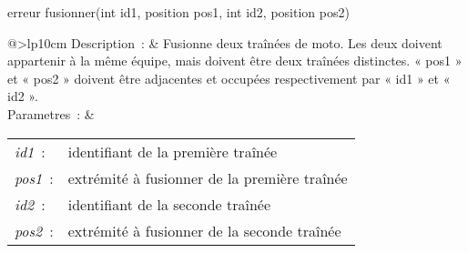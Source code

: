 \begin{minipage}{\linewidth}

\begin{lst-c++}
erreur fusionner(int id1, position pos1, int id2, position pos2)
\end{lst-c++}

\noindent
\begin{tabular}[t]{@{\extracolsep{0pt}}>{\bfseries}lp{10cm}}
Description~: & Fusionne deux traînées de moto. Les deux doivent appartenir à la même équipe, mais doivent être deux traînées distinctes. « pos1 » et « pos2 » doivent être adjacentes et occupées respectivement par « id1 » et « id2 ». \\


Parametres~: &
\begin{tabular}[t]{@{\extracolsep{0pt}}ll}
    
    
      
        \textsl{id1}~: & identifiant de la première traînée \\
      
    
      
        \textsl{pos1}~: & extrémité à fusionner de la première traînée \\
      
    
      
        \textsl{id2}~: & identifiant de la seconde traînée \\
      
    
      
        \textsl{pos2}~: & extrémité à fusionner de la seconde traînée \\
      
    
  \end{tabular} \\






\end{tabular} \\[0.3cm]
\end{minipage}
